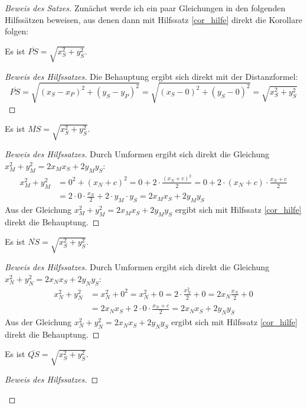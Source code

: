 \begin{proof}[Beweis des Satzes]
    Zunächst werde ich ein paar Gleichungen in den folgenden Hilfssätzen beweisen, aus denen dann mit Hilfssatz 
    \ref{cor_hilfe}
    direkt die Korollare folgen:
    \begin{lem}\label{no_P}
        Es ist $\overline{PS}=\sqrt{x_S^2+y_S^2}$.
    \end{lem}
    \begin{proof}[Beweis des Hilfssatzes]
        Die Behauptung ergibt sich direkt mit der Distanzformel:
        \[
        \overline{PS}=\sqrt{(x_S-x_P)^2+(y_S-y_P)^2}=\sqrt{(x_S-0)^2+(y_S-0)^2}=\sqrt{x_S^2+y_S^2}    
        \]
    \end{proof}
    \begin{lem}\label{no_M}
        Es ist $\overline{MS}=\sqrt{x_S^2+y_S^2}$.
    \end{lem}
    \begin{proof}[Beweis des Hilfssatzes]
        Durch Umformen ergibt sich direkt die Gleichung $x_M^2+y_M^2=2x_Mx_S+2y_My_S$:
        \begin{align*}
            x_M^2+y_M^2&=0^2+(x_N+c)^2=0+2\cdot \frac{(x_N+c)^2}{2}=0+2\cdot (x_N+c)\cdot\frac{x_N+c}{2}\\
            &=2\cdot 0\cdot \frac{x_N}{2}+2\cdot y_M\cdot y_S=2x_Mx_S+2y_My_S
        \end{align*}
        Aus der Gleichung $x_M^2+y_M^2=2x_Mx_S+2y_My_S$ ergibt sich mit Hilfssatz \ref{cor_hilfe} direkt die Behauptung.
    \end{proof}
    \begin{lem}\label{no_N}
        Es ist $\overline{NS}=\sqrt{x_S^2+y_S^2}$.
    \end{lem}
    \begin{proof}[Beweis des Hilfssatzes]
        Durch Umformen ergibt sich direkt die Gleichung $x_N^2+y_N^2=2x_Nx_S+2y_Ny_S$:
        \begin{align*}
            x_N^2+y_N^2&=x_N^2+0^2=x_N^2+0=2\cdot \frac{x_N^2}{2}+0=2x_N\frac{x_N}{2}+0\\
            &=2x_Nx_S+2\cdot 0\cdot \frac{x_N+c}{2}=2x_Nx_S+2y_Ny_S
        \end{align*}
        Aus der Gleichung $x_N^2+y_N^2=2x_Nx_S+2y_Ny_S$ ergibt sich mit Hilfssatz \ref{cor_hilfe} direkt die Behauptung.
    \end{proof}
    \begin{lem}\label{no_Q}
        Es ist $\overline{QS}=\sqrt{x_S^2+y_S^2}$.
    \end{lem}
    \begin{proof}[Beweis des Hilfssatzes]

\end{proof}
\end{proof}
